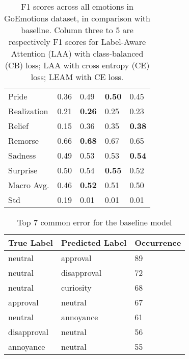 \begin{table}[h]
\begin{center}
\begin{tabular}{|l|l|l|l|l|}
        Pride &  0.36 & {0.49} & \textbf{0.50} & {0.45} \\
        Realization & 0.21 & \textbf{0.26} & {0.25} & {0.23} \\
        Relief & 0.15 & {0.36} & {0.35} & \textbf{0.38} \\
        Remorse & 0.66 & \textbf{0.68} & {0.67} & 0.65 \\
        Sadness & 0.49 & {0.53} & {0.53} & \textbf{0.54} \\
        Surprise & 0.50 & {0.54} & \textbf{0.55} & {0.52}\\
        \hline
        Macro Avg. & 0.46 &\textbf{0.52} & {0.51} & {0.50} \\
        \hline
        Std & 0.19 & 0.01  & 0.01 & 0.01 \\ %
        \hline
    \end{tabular}
    \end{center}
    \caption{F1 scores across all emotions in GoEmotions dataset, in comparison with baseline. Column three to 5 are respectively F1 scores for Label-Aware Attention (LAA) with class-balanced (CB) loss; LAA with cross entropy (CE) loss; LEAM with CE loss. } %
    \label{tab:full}
\end{table}

\begin{table}[h!]
\caption{Top 7 common error for the baseline model}
\centering
\begin{tabular}{l  l  l }
\hline\hline
True Label& Predicted Label & Occurrence  \\ [0.5ex]
\hline 
neutral  & approval  & 89\\
neutral  & disapproval  & 72\\
neutral  & curiosity  & 68\\
approval  & neutral  & 67\\
neutral  & annoyance  & 61\\
disapproval  & neutral  & 56\\
annoyance  & neutral  & 55\\[1ex]
\hline 
\end{tabular}
\label{table:baseE} 
\end{table}